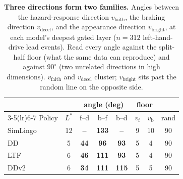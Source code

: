 \begin{table}[t]
\centering
\caption{\textbf{Three directions form two families.}
Angles between the hazard-response direction $v_{\mathrm{faith}}$, the braking direction
$v_{\mathrm{decel}}$, and the appearance direction $v_{\mathrm{bright}}$, at each model's
deepest gated layer ($n{=}312$ left-hand-drive lead events). Read every angle against
the split-half floor (what the same data can reproduce) and against $90^\circ$ (two
unrelated directions in high dimensions). $v_{\mathrm{faith}}$ and $v_{\mathrm{decel}}$
cluster; $v_{\mathrm{bright}}$ sits past the random line on the opposite side.}
\label{tab:geometry}
\small
\setlength{\tabcolsep}{4pt}
\begin{tabular}{lccccccc}
\toprule
& & \multicolumn{3}{c}{angle (deg)} & \multicolumn{2}{c}{floor} & \\
\cmidrule(lr){3-5}\cmidrule(lr){6-7}
Policy & $L^*$ & f--d & b--f & b--d & $v_{\mathrm{f}}$ & $v_{\mathrm{b}}$ & rand \\
\midrule
SimLingo & 12 & \textbf{--} & \textbf{133} & \textbf{--} & 9 & 10 & 90 \\
DD & 5 & \textbf{44} & \textbf{96} & \textbf{93} & 5 & 4 & 90 \\
LTF & 6 & \textbf{46} & \textbf{111} & \textbf{93} & 5 & 4 & 90 \\
DDv2 & 6 & \textbf{34} & \textbf{111} & \textbf{115} & 5 & 5 & 90 \\
\bottomrule
\end{tabular}
\end{table}